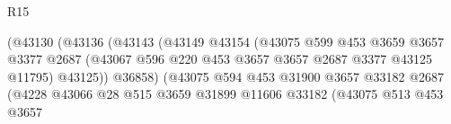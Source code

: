 \begin{lexlean}{R15}
\begin{coremodule}
                                              (@43130
                                                (@43136
                                                  (@43143
                                                    (@43149
                                                      @43154
                                                      (@43075
                                                        @599
                                                        @453
                                                        @3659
                                                        @3657
                                                        @3377
                                                        @2687
                                                        (@43067
                                                          @596
                                                          @220
                                                          @453
                                                          @3657
                                                          @3657
                                                          @2687
                                                          @3377
                                                          @43125
                                                          @11795)
                                                        @43125))
                                                    @36858)
                                                  (@43075
                                                    @594
                                                    @453
                                                    @31900
                                                    @3657
                                                    @33182
                                                    @2687
                                                    (@4228
                                                      @43066
                                                      @28
                                                      @515
                                                      @3659
                                                      @31899
                                                      @11606
                                                      @33182
                                                      (@43075
                                                        @513
                                                        @453
                                                        @3657

\end{coremodule}
\end{lexlean}
